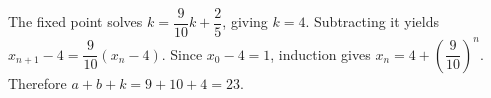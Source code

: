 The fixed point solves $k=\dfrac{9}{10}k+\dfrac{2}{5}$, giving $k=4$. Subtracting it yields $x_{n+1}-4=\dfrac{9}{10}(x_n-4)$. Since $x_0-4=1$, induction gives $x_n=4+(\dfrac{9}{10})^n$. Therefore $\boxed{a+b+k=9+10+4=23}$.
